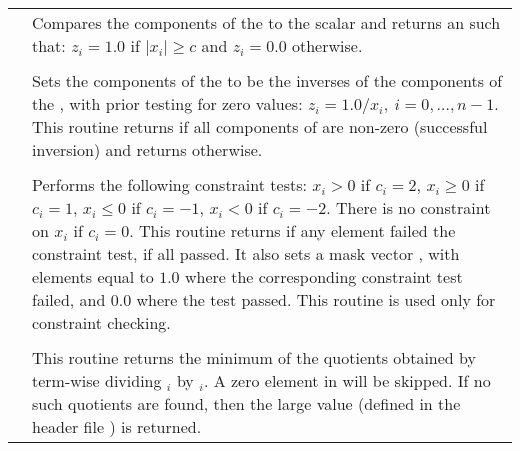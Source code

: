 \begin{supertabular}{|p{\colone}|p{\coltwo}|}
& Compares the components of the   to the scalar
 and returns an   such that:
$z_i = 1.0$ if $| x_i | \ge c$ and $z_i = 0.0$ otherwise.
\\
%
 &  \\
& Sets the components of the   to be the inverses
of the components of the  , with prior testing
for zero values:
$z_i = 1.0 /  x_i  , \: i=0,\ldots,n-1$.
This routine returns  if all components of  are
non-zero (successful inversion) and returns  otherwise.  
\\
%
 &  \\
& Performs the following constraint tests:
$x_i > 0$ if $c_i=2$,
$x_i \ge 0$ if $c_i=1$,
$x_i \le 0$ if $c_i=-1$,
$x_i < 0$ if $c_i=-2$.
There is no constraint on $x_i$ if $c_i=0$.
This routine returns  if any element failed
the constraint test,  if all passed.  It also sets a
mask vector , with elements equal to $1.0$ where the
corresponding constraint test failed, and $0.0$
where the test passed.
This routine is used only for constraint checking.
\\
%
 &  \\
& This routine returns the minimum of the quotients obtained   
by term-wise dividing $_i$ by $_i$. 
A zero element in  will be skipped. 
If no such quotients are found, then the large value 
 (defined in the header file )
is returned. 
\\
%
\end{supertabular}
\bigskip
